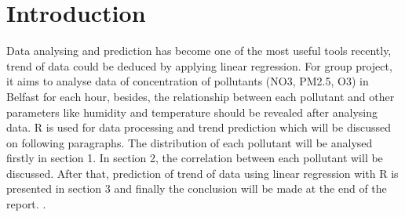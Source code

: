 \documentclass[a4paper,12pt,reqno]{report}
\begin{document}
\section{Introduction}
\label{sec:Introduction}
Data analysing and prediction has become one of the most useful tools recently, trend of data could be deduced by applying linear regression. For group project, it aims to analyse data of concentration of pollutants (NO3, PM2.5, O3) in Belfast for each hour, besides, the relationship between each pollutant and other parameters like humidity and temperature should be revealed after analysing data. R is used for data processing and trend prediction which will be discussed on following paragraphs. The distribution of each pollutant will be analysed firstly in section 1. In section 2, the correlation between each pollutant will be discussed. After that, prediction of trend of data using linear regression with R is presented in section 3 and finally the conclusion will be made at the end of the report. 
\cite{Basic_Information_about_NO2}. 
\newpage

\end{document}
